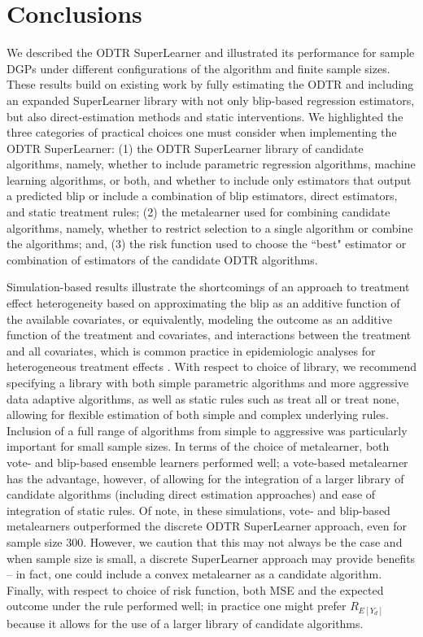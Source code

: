 \documentclass[a4paper,12pt]{article}
\begin{document}
\section{Conclusions}


We described the ODTR SuperLearner and illustrated its performance for sample DGPs under different configurations of the algorithm and finite sample sizes. These results build on existing work \citep{luedtke2016super, coyle2017computational} by fully estimating the ODTR and including an expanded SuperLearner library with not only blip-based regression estimators, but also direct-estimation methods and static interventions. We highlighted the three categories of practical choices one must consider when implementing the ODTR SuperLearner: (1) the ODTR SuperLearner library of candidate algorithms, namely, whether to include parametric regression algorithms, machine learning algorithms, or both, and whether to include only estimators that output a predicted blip or include a combination of blip estimators, direct estimators, and static treatment rules; (2) the metalearner used for combining candidate algorithms, namely, whether to restrict selection to a single algorithm or combine the algorithms; and, (3) the risk function used to choose the ``best" estimator or combination of estimators of the candidate ODTR algorithms.


Simulation-based results illustrate the shortcomings of an approach to treatment effect heterogeneity based on approximating the blip as an additive function of the available covariates, or equivalently, modeling the outcome as an additive function of the treatment and covariates, and interactions between the treatment and all covariates, which is common practice in epidemiologic analyses for heterogeneous treatment effects \citep{dahabreh2016using, varadhan2013framework, yusuf1991analysis, van2015estimates}. With respect to choice of library, we recommend specifying a library with both simple parametric algorithms and more aggressive data adaptive algorithms, as well as static rules such as treat all or treat none, allowing for flexible estimation of both simple and complex underlying rules. Inclusion of a full range of algorithms from simple to aggressive was particularly important for small sample sizes. In terms of the choice of metalearner, both vote- and blip-based ensemble learners performed well; a vote-based metalearner has the advantage, however, of allowing for the integration of a larger library of candidate algorithms (including direct estimation approaches) and ease of integration of static rules. Of note, in these simulations, vote- and blip-based metalearners outperformed the discrete ODTR SuperLearner approach, even for sample size 300. However, we caution that this may not always be the case and when sample size is small, a discrete SuperLearner approach may provide benefits -- in fact, one could include a convex metalearner as a candidate algorithm. Finally, with respect to choice of risk function, both MSE and the expected outcome under the rule performed well; in practice one might prefer $R_{E[Y_d]}$ because it allows for the use of a larger library of candidate algorithms.  
\end{document}
